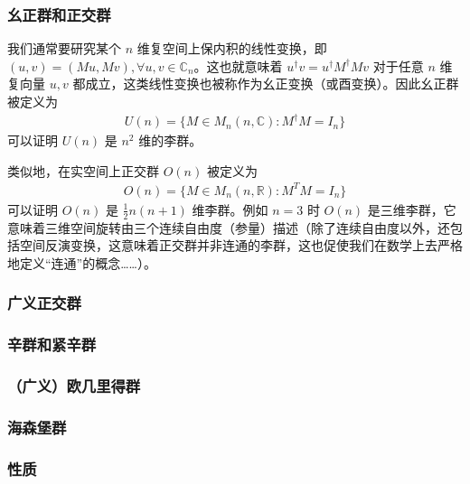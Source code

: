 \subsubsection{幺正群和正交群}
我们通常要研究某个 $n$ 维复空间上保内积的线性变换，即 $(u,v)=(Mu,Mv),\forall u,v\in \mathbb{C}_n$。这也就意味着 $u^\dagger v=u^\dagger M^\dagger M v$ 对于任意 $n$ 维复向量 $u,v$ 都成立，这类线性变换也被称作为幺正变换（或酉变换）。因此幺正群被定义为
\begin{equation}
\begin{aligned}
U(n)=\{ M\in M_n(n,\mathbb C): M^\dagger M=I_n \}
\end{aligned}
\end{equation}
可以证明 $U(n)$ 是 $n^2$ 维的李群。

类似地，在实空间上正交群 $O(n)$ 被定义为 
\begin{equation}
\begin{aligned}
O(n)=\{ M\in M_n(n,\mathbb R): M^T M=I_n \}
\end{aligned}
\end{equation}
可以证明 $O(n)$ 是 $\frac{1}{2}n(n+1)$ 维李群。例如 $n=3$ 时 $O(n)$ 是三维李群，它意味着三维空间旋转由三个连续自由度（参量）描述（除了连续自由度以外，还包括空间反演变换，这意味着正交群并非连通的李群，这也促使我们在数学上去严格地定义“连通”的概念……）。
\subsubsection{广义正交群}



\subsubsection{辛群和紧辛群}

\subsubsection{（广义）欧几里得群}

\subsubsection{海森堡群}

\subsubsection{性质}

